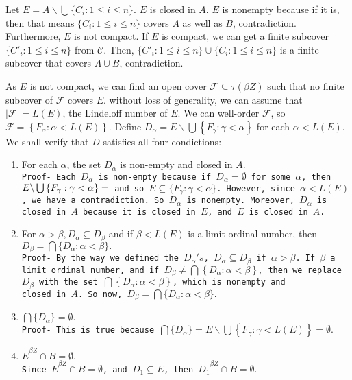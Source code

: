 \documentclass{article}
\begin{document}
Let $E=A\backslash \bigcup \{C_i:1\leq i \leq n\}$. $E$ is closed in $A$. $E$ is nonempty because if it is, then that means $\{C_i:1\leq i \leq n\}$ covers $A$ as well as $B$, contradiction. Furthermore, $E$ is not compact. If $E$ is compact, we can get a finite subcover $\{C'_i:1\leq i\leq n\}$ from $\mathcal{C}$. Then, $\{C'_i:1\leq i\leq n\} \cup \{C_i:1\leq i \leq n\}$ is a finite subcover that covers $A\cup B$, contradiction. 


\vskip 10pt


As $E$ is not compact, we can find an open cover $\mathcal{F}\subseteq \tau(\beta Z)$ such that no finite subcover of $\mathcal{F}$ covers $E$. 
without loss of generality, we can assume that $|\mathcal{F}|=L(E)$, the Lindeloff number of $E$. We can well-order $\mathcal{F}$, so $\mathcal{F}=\left\{F_\alpha: \alpha<L(E)\right\}$.
Define $D_\alpha=E\backslash \bigcup \left\{F_\gamma: \gamma<\alpha\right\}$ for each $\alpha < L(E)$. We shall verify that $D$ satisfies all four condictions:


\begin{enumerate}
\item For each $  \alpha  $, the set $ D_\alpha  $ is non-empty and closed in $A$.\\
\texttt{Proof- Each $D_\alpha$ is non-empty because if $D_\alpha=\emptyset$ for some $\alpha$, then $E\backslash \bigcup \left\{F_\gamma: \gamma<\alpha\right\}=\empty$ and so $E \subseteq \{F_\gamma: \gamma<\alpha\}$. However, since $\alpha<L(E)$, we have a contradiction. So $D_\alpha$ is nonempty. Moreover, $D_\alpha$ is closed in $A$ because it is closed in $E$, and $E$ is closed in $A$.}
\vskip 10pt
\item For $ \alpha>\beta, D_\alpha \subseteq D_\beta  $ and if $  \beta <L(E) $ is a limit ordinal number, then\\$  D_\beta=\bigcap \{D_\alpha:\alpha <\beta\}.$\\
\texttt{Proof- By the way we defined the $D_\alpha's$, $D_\alpha\subseteq D_\beta$ if $\alpha>\beta$. If $\beta$ a limit ordinal number, and 
if $D_\beta \neq \bigcap\left\{D_\alpha:\alpha<\beta\right\}, $ then we replace $D_\beta$ with the set $\bigcap\left\{D_\alpha:\alpha<\beta\right\}$, which is nonempty and\\ closed in $A$. So now, $ D_\beta=\bigcap \{D_\alpha:\alpha <\beta\}.$}
\vskip 10pt
\item $ \bigcap\{D_\alpha\}=\emptyset . $\\
\texttt{Proof- This is true because $ \bigcap\{D_\alpha\}= E\backslash\bigcup\left\{F_\gamma: \gamma<L(E)\right\}=\emptyset.$}

\vskip 10pt
\item $\overline{E}^{\beta Z} \cap B =\emptyset.$\\
\texttt{Since $\overline{E}^{\beta Z} \cap B=\emptyset$, and $D_1\subseteq E$, then $\overline{D_1}^{\beta Z}\cap B=\emptyset.$}	 
\end{enumerate}
\end{document}
